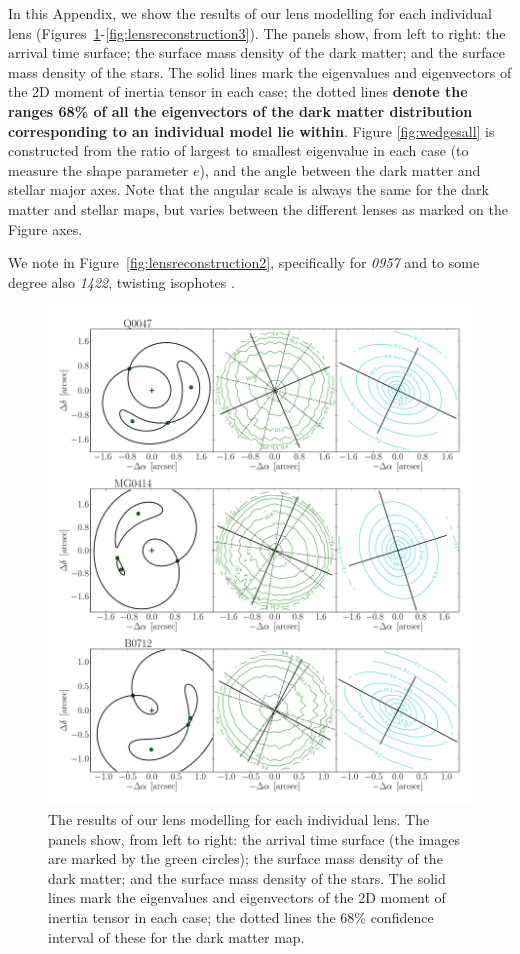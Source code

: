\documentclass[useAMS,usenatbib]{mn2e}
\newcommand{\cb}[1]{{\color{red} \textbf{#1}}}
\begin{document}
In this Appendix, we show the results of our lens modelling for each individual lens (Figures~\ref{fig:lensreconstruction1}-\ref{fig:lensreconstruction3}). The panels show, from left to right: the arrival time surface; the surface mass density of the dark matter; and the surface mass density of the stars. The solid lines mark the eigenvalues and eigenvectors of the 2D moment of inertia tensor in each case; the dotted lines \cb{denote the ranges 68\% of all the eigenvectors of the dark matter distribution corresponding to an individual model lie within}. Figure \ref{fig:wedgesall} is constructed from the ratio of largest to smallest eigenvalue in each case (to measure the shape parameter $e$), and the angle between the dark matter and stellar major axes. Note that the angular scale is always the same for the dark matter and stellar maps, but varies between the different lenses as marked on the Figure axes.

We note in Figure~\ref{fig:lensreconstruction2}, specifically for {\it0957} and to some degree also {\it1422}, twisting isophotes \citep[e.g.][]{1978ComAp...8...27B}.

\begin{figure}
  \centering
  \includegraphics[width=.8\linewidth]{Figures/AllLenses31.pdf}
  \caption[width=.65\linewidth]{The results of our lens modelling for each individual lens. The panels show, from left to right: the arrival time surface (the images are marked by the green circles); the surface mass density of the dark matter; and the surface mass density of the stars. The solid lines mark the eigenvalues and eigenvectors of the 2D moment of inertia tensor in each case; the dotted lines the 68\% confidence interval of these for the dark matter map.}
  \label{fig:lensreconstruction1}
\end{figure}
\end{document}
